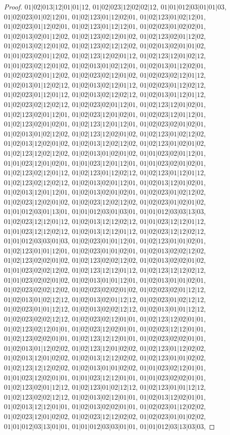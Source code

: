 \documentclass[12pt]{article}
\theoremstyle{plain}
\theoremstyle{definition}
\theoremstyle{remark}
\begin{document}
\begin{proof}
$01|02|013|12|01|01|12$, $01|02|023|12|02|02|12$, $01|01|012|03|01|01|03$, $01|02|023|01|02|12|01$, $01|02|123|01|12|02|01$, $01|02|123|01|02|12|01$, $01|02|023|01|12|02|01$, $01|02|123|01|12|12|01$, $01|02|023|01|02|02|01$, $01|02|013|02|01|12|02$, $01|02|123|02|12|01|02$, $01|02|123|02|01|12|02$, $01|02|013|02|12|01|02$, $01|02|123|02|12|12|02$, $01|02|013|02|01|01|02$, $01|01|023|02|01|12|02$, $01|02|123|12|02|01|12$, $01|02|123|12|01|02|12$, $01|01|023|02|12|01|02$, $01|02|013|01|02|12|01$, $01|02|013|01|12|02|01$, $01|02|023|02|01|12|02$, $01|02|023|02|12|01|02$, $01|02|023|02|12|01|12$, $01|02|013|01|12|02|12$, $01|02|013|02|12|01|12$, $01|02|023|01|12|02|12$, $01|02|023|01|12|01|12$, $01|02|013|02|12|02|12$, $01|02|013|01|12|01|12$, $01|02|023|02|12|02|12$, $01|02|023|02|01|12|01$, $01|02|123|12|01|02|01$, $01|02|123|02|01|12|01$, $01|02|023|12|01|02|01$, $01|02|023|12|01|12|01$, $01|02|123|02|01|02|01$, $01|02|123|12|01|12|01$, $01|02|023|02|01|02|01$, $01|02|013|01|02|12|02$, $01|02|123|12|02|01|02$, $01|02|123|01|02|12|02$, $01|02|013|12|02|01|02$, $01|02|013|12|02|12|02$, $01|02|123|01|02|01|02$, $01|02|123|12|02|12|02$, $01|02|013|01|02|01|02$, $01|01|023|02|01|12|01$, $01|01|023|12|01|02|01$, $01|01|023|12|01|12|01$, $01|01|023|02|01|02|01$, $01|02|123|02|12|01|12$, $01|02|123|01|12|02|12$, $01|02|123|01|12|01|12$, $01|02|123|02|12|02|12$, $01|02|013|02|01|12|01$, $01|02|013|12|01|02|01$, $01|02|013|12|01|12|01$, $01|02|013|02|01|02|01$, $01|02|023|01|02|12|02$, $01|02|023|12|02|01|02$, $01|02|023|12|02|12|02$, $01|02|023|01|02|01|02$, $01|01|012|03|01|13|01$, $01|01|012|03|01|03|01$, $01|01|012|03|03|13|03$, $01|02|023|12|12|01|12$, $01|02|013|12|12|02|12$, $01|01|023|12|12|01|12$, $01|01|023|12|12|02|12$, $01|02|013|12|12|01|12$, $01|02|023|12|12|02|12$, $01|01|012|03|03|01|03$, $01|02|023|01|01|12|01$, $01|02|123|01|01|02|01$, $01|02|123|01|01|12|01$, $01|02|023|01|01|02|01$, $01|02|013|02|02|12|02$, $01|02|123|02|02|01|02$, $01|02|123|02|02|12|02$, $01|02|013|02|02|01|02$, $01|01|023|02|02|12|02$, $01|02|123|12|12|01|12$, $01|02|123|12|12|02|12$, $01|01|023|02|02|01|02$, $01|02|013|01|01|12|01$, $01|02|013|01|01|02|01$, $01|02|023|02|02|12|02$, $01|02|023|02|02|01|02$, $01|02|023|02|01|12|12$, $01|02|013|01|02|12|12$, $01|02|013|02|01|12|12$, $01|02|023|01|02|12|12$, $01|02|023|01|01|12|12$, $01|02|013|02|02|12|12$, $01|02|013|01|01|12|12$, $01|02|023|02|02|12|12$, $01|02|023|02|12|01|01$, $01|02|123|12|02|01|01$, $01|02|123|02|12|01|01$, $01|02|023|12|02|01|01$, $01|02|023|12|12|01|01$, $01|02|123|02|02|01|01$, $01|02|123|12|12|01|01$, $01|02|023|02|02|01|01$, $01|02|013|01|12|02|02$, $01|02|123|12|01|02|02$, $01|02|123|01|12|02|02$, $01|02|013|12|01|02|02$, $01|02|013|12|12|02|02$, $01|02|123|01|01|02|02$, $01|02|123|12|12|02|02$, $01|02|013|01|01|02|02$, $01|01|023|02|12|01|01$, $01|01|023|12|02|01|01$, $01|01|023|12|12|01|01$, $01|01|023|02|02|01|01$, $01|02|123|02|01|12|12$, $01|02|123|01|02|12|12$, $01|02|123|01|01|12|12$, $01|02|123|02|02|12|12$, $01|02|013|02|12|01|01$, $01|02|013|12|02|01|01$, $01|02|013|12|12|01|01$, $01|02|013|02|02|01|01$, $01|02|023|01|12|02|02$, $01|02|023|12|01|02|02$, $01|02|023|12|12|02|02$, $01|02|023|01|01|02|02$, $01|01|012|03|13|01|01$, $01|01|012|03|03|01|01$, $01|01|012|03|13|03|03$, 
\end{proof}
\end{document}
